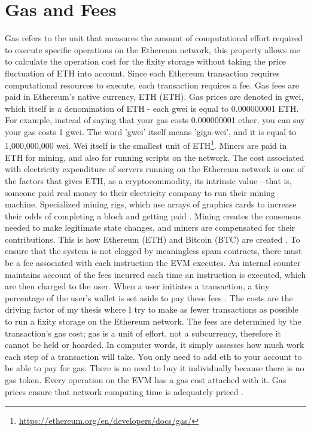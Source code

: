 \section{Gas and Fees}
\label{sec:costs}
Gas refers to the unit that measures the amount of computational effort required to execute specific operations on the Ethereum network, this property allows me to calculate the operation cost for the fixity storage without taking the price fluctuation of ETH into account. Since each Ethereum transaction requires computational resources to execute, each transaction requires a fee.
Gas fees are paid in Ethereum's native currency, ETH (ETH). Gas prices are denoted in gwei, which itself is a denomination of ETH - each gwei is equal to 0.000000001 ETH. For example, instead of saying that your gas costs 0.000000001 ether, you can say your gas costs 1 gwei. The word 'gwei' itself means 'giga-wei', and it is equal to 1,000,000,000 wei. Wei itself is the smallest unit of ETH\footnote{\url{https://ethereum.org/en/developers/docs/gas/}}.
Miners are paid in ETH for mining, and also for running scripts on the network. The cost associated with electricity expenditure of servers running on the Ethereum network is one of the factors that gives ETH, as a cryptocommodity, its intrinsic value—that is, someone paid real money to their electricity company to run their mining machine. Specialized mining rigs, which use arrays of graphics cards to increase their odds of completing a block and getting paid \cite[12]{dannen2017introducing}. 
Mining creates the consensus needed to make legitimate state changes, and miners are compensated for their contributions. This is how Ethereum (ETH) and Bitcoin (BTC) are created \cite[57]{dannen2017introducing}. 
To ensure that the system is not clogged by meaningless spam contracts, there must be a fee associated with each instruction the EVM executes. An internal counter maintains account of the fees incurred each time an instruction is executed, which are then charged to the user. When a user initiates a \gls{transaction}, a tiny percentage of the user's wallet is set aside to pay these fees \cite[58]{dannen2017introducing}. The costs are the driving factor of my thesis where I try to make as fewer transactions as possible to run a fixity storage on the Ethereum network. 
The fees are determined by the transaction's gas cost; gas is a unit of effort, not a subcurrency, therefore it cannot be held or hoarded. In computer words, it simply assesses how much work each step of a transaction will take. You only need to add \acrshort{eth} to your account to be able to pay for gas. There is no need to buy it individually because there is no gas token. Every operation on the EVM has a gas cost attached with it. Gas prices ensure that network computing time is adequately priced \cite[59]{dannen2017introducing}.
